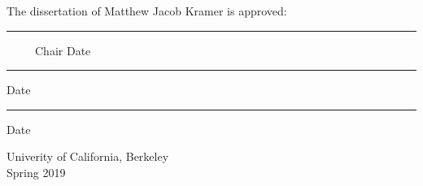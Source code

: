 \MyDoubleSpacing

\begin{minipage}{0.85\linewidth}
  \begin{center}
    The dissertation of Matthew Jacob Kramer is approved:

    \vspace{3.5\baselineskip}
    \hrule\vspace{0.25\baselineskip}
    {\small\ \ \ \ \ Chair \hfill Date}
    \vspace{3\baselineskip}
    \hrule\vspace{0.25\baselineskip}
    {\small\hfill Date}
    \vspace{3\baselineskip}
    \hrule\vspace{0.25\baselineskip}
    {\small\hfill Date}
    \vspace{2.5\baselineskip}   %

    Univerity of California, Berkeley\\
    \vspace{1.5\baselineskip}
    Spring 2019
  \end{center}
\end{minipage}

\clearpage
